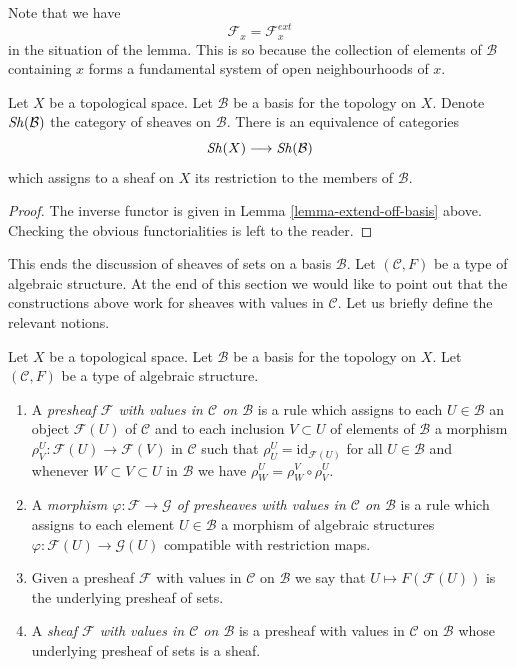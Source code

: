 \noindent
Note that we have
$$
\mathcal{F}_x = \mathcal{F}_x^{ext}
$$
in the situation of the lemma. This is so because the
collection of elements of $\mathcal{B}$ containing
$x$ forms a fundamental system of open neighbourhoods of $x$.

\begin{lemma}
\label{lemma-restrict-basis-equivalence}
Let $X$ be a topological space.
Let $\mathcal{B}$ be a basis for the topology on $X$.
Denote $\mathop{\mathit{Sh}}\nolimits(\mathcal{B})$ the category of
sheaves on $\mathcal{B}$.
There is an equivalence of categories
$$
\mathop{\mathit{Sh}}\nolimits(X) \longrightarrow \mathop{\mathit{Sh}}\nolimits(\mathcal{B})
$$
which assigns to a sheaf on $X$ its restriction to
the members of $\mathcal{B}$.
\end{lemma}

\begin{proof}
The inverse functor is given in Lemma \ref{lemma-extend-off-basis} above.
Checking the obvious functorialities is left to the
reader.
\end{proof}

\noindent
This ends the discussion of sheaves of sets on
a basis $\mathcal{B}$. Let $(\mathcal{C}, F)$ be
a type of algebraic structure. At the end of this section
we would like to point out that the constructions
above work for sheaves with values in $\mathcal{C}$.
Let us briefly define the relevant notions.

\begin{definition}
\label{definition-sheaf-structures-basis}
Let $X$ be a topological space. Let $\mathcal{B}$ be a
basis for the topology on $X$. Let $(\mathcal{C}, F)$ be
a type of algebraic structure.
\begin{enumerate}
\item A {\it presheaf $\mathcal{F}$ with values in $\mathcal{C}$
on $\mathcal{B}$} is a rule which assigns to each
$U \in \mathcal{B}$ an object
$\mathcal{F}(U)$ of $\mathcal{C}$ and to each inclusion $V \subset U$
of elements of $\mathcal{B}$ a morphism
$\rho^U_V : \mathcal{F}(U) \to \mathcal{F}(V)$ in $\mathcal{C}$ such that
$\rho^U_U = \text{id}_{\mathcal{F}(U)}$ for all $U \in \mathcal{B}$ and
whenever $W \subset V \subset U$ in $\mathcal{B}$ we have
$\rho^U_W = \rho^V_W \circ \rho ^U_V$.
\item A {\it morphism $\varphi : \mathcal{F} \to \mathcal{G}$
of presheaves with values in $\mathcal{C}$
on $\mathcal{B}$} is a rule which assigns to each
element $U \in \mathcal{B}$ a morphism of
algebraic structures $\varphi : \mathcal{F}(U) \to \mathcal{G}(U)$
compatible with restriction maps.
\item Given a presheaf $\mathcal{F}$ with values in $\mathcal{C}$
on $\mathcal{B}$ we say that $U \mapsto F(\mathcal{F}(U))$ is the
underlying presheaf of sets.
\item A {\it sheaf $\mathcal{F}$ with values in $\mathcal{C}$
on $\mathcal{B}$} is a presheaf with values in $\mathcal{C}$
on $\mathcal{B}$ whose underlying presheaf of sets is a sheaf.
\end{enumerate}
\end{definition}

